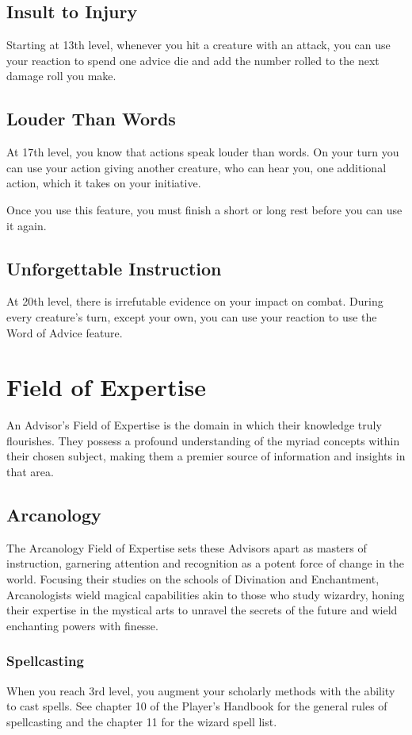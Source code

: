 \documentclass[letterpaper,openany,twoside,twocolumn]{book}
\begin{document}
	\subsection*{Insult to Injury}
	Starting at 13th level, whenever you hit a creature with an attack, you can use your reaction to spend one advice die and add the number rolled to the next damage roll you make.
	
	\subsection*{Louder Than Words}
	At 17th level, you know that actions speak louder than words. On your turn you can use your action giving another creature, who can hear you, one additional action, which it takes on your initiative.
	
	Once you use this feature, you must finish a short or long rest before you can use it again.
	
	\subsection*{Unforgettable Instruction}
	At 20th level, there is irrefutable evidence on your impact on combat. During every creature's turn, except your own, you can use your reaction to use the Word of Advice feature.
	
	\section*{Field of Expertise}
	An Advisor's Field of Expertise is the domain in which their knowledge truly flourishes. They possess a profound understanding of the myriad concepts within their chosen subject, making them a premier source of information and insights in that area.
	
	\subsection*{Arcanology}
	The Arcanology Field of Expertise sets these Advisors apart as masters of instruction, garnering attention and recognition as a potent force of change in the world. Focusing their studies on the schools of Divination and Enchantment, Arcanologists wield magical capabilities akin to those who study wizardry, honing their expertise in the mystical arts to unravel the secrets of the future and wield enchanting powers with finesse.
	
	\subsubsection*{Spellcasting}
	When you reach 3rd level, you augment your scholarly methods with the ability to cast spells. See chapter 10 of the Player's Handbook for the general rules of spellcasting and the chapter 11 for the wizard spell list.
	
\end{document}
